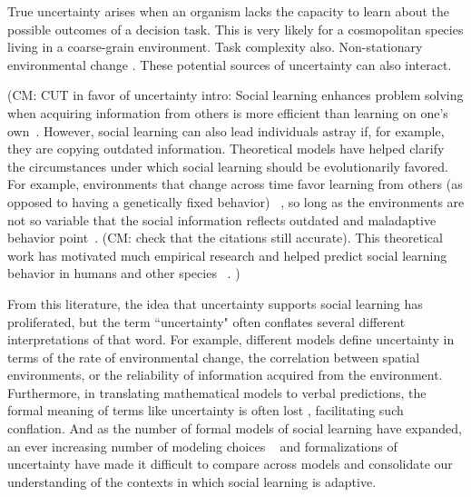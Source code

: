 \documentclass[letterpaper,11.5pt]{scrartcl}
\newcommand{\cm}[1]{{\textcolor{mypurple} {({\tiny CM:} #1)}}}
\begin{document}
True uncertainty arises when an organism lacks the capacity to learn about the possible outcomes of a decision task. This is very likely for a cosmopolitan species living in a coarse-grain environment. Task complexity also. Non-stationary environmental change \cite{kay_king2020}. These potential sources of uncertainty can also interact. 


\cm{CUT in favor of uncertainty intro: Social learning enhances problem solving when acquiring information from others is more efficient than learning on one's own~\cite{Laland2004}. However, social learning can also lead individuals astray if, for example, they are copying outdated information. Theoretical models have helped clarify the circumstances under which social learning should be evolutionarily favored. For example, environments that change across time favor learning from others (as opposed to having a genetically fixed behavior) ~\cite{BoydRicherson1985,Henrich1998}, so long as the environments are not so variable that the social information reflects outdated and maladaptive behavior point~\cite{Rogers1988,Feldman1996, aoki2014evolution}. \cm{check that the citations still accurate}. This theoretical work has motivated much empirical research and helped predict social learning behavior in humans and other species ~\cite{McElreath2005,Kendal2018,Allen2019}.
}

From this literature, the idea that uncertainty supports social learning has proliferated, but the term ``uncertainty" often conflates several different interpretations of that word. For example, different models define uncertainty in terms of the rate of environmental change, the correlation between spatial environments, or the reliability of information acquired from the environment. 
Furthermore, in translating mathematical models to verbal predictions, the formal meaning of terms like uncertainty is often lost \cite{lawson1988probability}, facilitating such conflation. 
And as the number of formal models of social learning have expanded, an ever increasing number
of modeling choices ~\cite[Figure 1]{Kendal2018} and formalizations of uncertainty have made it difficult to compare across models and consolidate our understanding of the contexts in which social learning is adaptive.  
\end{document}
